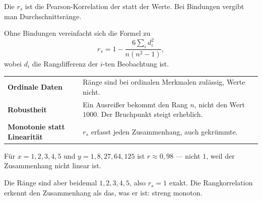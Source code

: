 \begin{definition}
Die  $r_s$ ist die Pearson-Korrelation der  statt der Werte. Bei Bindungen vergibt man Durchschnittsränge.

Ohne Bindungen vereinfacht sich die Formel zu
\[ r_s = 1 - \frac{6\sum_i d_i^2}{n(n^2-1)} , \]
wobei $d_i$ die Rangdifferenz der $i$-ten Beobachtung ist.
\end{definition}

\begin{merksatz}
\begin{center}
\renewcommand{\arraystretch}{1.5}
\begin{tabular}{@{}P{2.8cm}P{5.8cm}@{}}
\toprule
\textbf{Ordinale Daten} & Ränge sind bei ordinalen Merkmalen zulässig, Werte nicht.\\
\textbf{Robustheit} & Ein Ausreißer bekommt den Rang $n$, nicht den Wert $1000$. Der Bruchpunkt steigt erheblich.\\
\textbf{Monotonie statt Linearität} & $r_s$ erfasst jeden  Zusammenhang, auch gekrümmte.\\
\bottomrule
\end{tabular}
\end{center}

Für $x = 1,2,3,4,5$ und $y = 1,8,27,64,125$ ist $r \approx 0{,}98$ --- nicht $1$, weil der Zusammenhang nicht linear ist.

Die Ränge sind aber beidemal $1,2,3,4,5$, also $r_s = 1$ exakt. Die Rangkorrelation erkennt den Zusammenhang als das, was er ist: streng monoton.
\end{merksatz}

